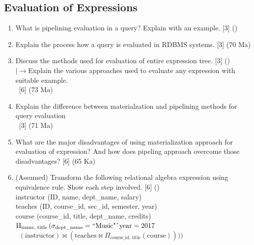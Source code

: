 \documentclass[12pt]{article}
\newcommand{\lb}{\\$\left|\rightarrow\right.$}
\newcommand{\enter}{\\\textcolor{white}{1}}
\begin{document}
    \subsection{Evaluation of Expressions}
        \begin{enumerate}[noitemsep, topsep=0pt]            
            \item What is pipelining evaluation in a query? Explain with an example. \hfill [3] ()
            
            \item Explain the process how a query is evaluated in RDBMS systems. \hfill [3] (70 Ma)
            
			\item Discuss the methods used for evaluation of entire expression tree. \hfill [3] ()   
			\lb Explain the various approaches used to evaluate any expression with suitable example. 
			\enter\hfill [6] (73 Ma) 			
			
			\item Explain the difference between materialzation and pipelining methods for query evaluation 
			\enter\hfill [3] (71 Ma)
    			
			\item What are the major disadvantages of using materialization approach for evaluation of expression? And how does pipeling approach overcome those disadvantages? \hfill [6] (65 Ka)    			
    			
    			\item (Assumed) Transform the following relational algebra expression using equivalence rule. Show each step involved. \hfill [6] ()\\
    			instructor (ID, name, dept\_name, salary)\\
    			teaches (ID, course\_id, sec\_id, semester, year)\\
    			course (course\_id, title, dept\_name, credits)\\
    			$\Pi_{\text{name, title}} \left( 
    \sigma_{\text{dept\_name}} = \text{``Music"} \char`\^ \text{year} = 2017 \right.$
			\enter\hspace{2cm}$ (\text{instructor}) \bowtie \left( \text{teaches} \bowtie \Pi_{\text{course\_id, title}} (\text{course}) \right))) $
    		\end{enumerate}
    		
\end{document}
